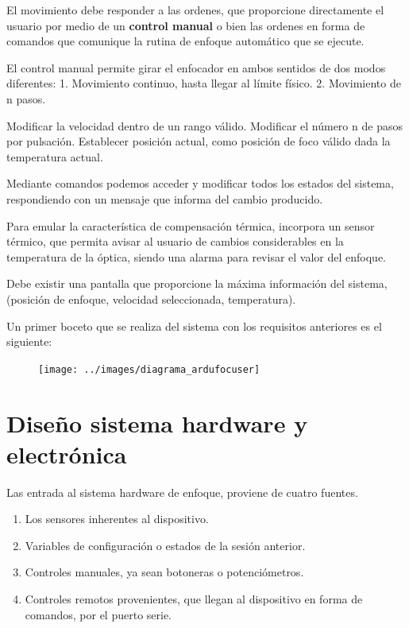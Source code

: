 El movimiento debe responder a las ordenes, que proporcione directamente el usuario por medio de un \textbf{control manual} o bien las ordenes en forma de comandos  que comunique la rutina de enfoque automático que se ejecute.

El control manual permite girar el enfocador en ambos sentidos de dos modos diferentes:
    1. Movimiento continuo, hasta llegar al límite físico.
    2. Movimiento de n pasos.

Modificar la velocidad dentro de un rango válido.
Modificar el número n de pasos por pulsación. 
Establecer posición actual, como posición de foco válido dada la temperatura actual. 
 
Mediante comandos podemos acceder y modificar todos los estados del sistema, respondiendo con un mensaje que informa del cambio producido. 

Para emular la característica de compensación térmica, incorpora un sensor térmico, que permita avisar al usuario de cambios considerables en la temperatura de la óptica, siendo una alarma para revisar el valor del enfoque.  

Debe existir una pantalla que proporcione la máxima información del sistema, (posición de enfoque, velocidad seleccionada, temperatura).


Un primer boceto que se realiza del sistema con los requisitos anteriores es el siguiente:

\begin{figure}[h]
\centering
\texttt{[image: ../images/diagrama\_ardufocuser]}
\caption{}
\label{fig:diagrama_ardufocuser}
\end{figure}


\section{Diseño sistema hardware y electrónica}

Las entrada al sistema hardware de enfoque, proviene de cuatro fuentes.

\begin{enumerate}
\item Los sensores inherentes al dispositivo.
\item Variables de configuración o estados de la sesión anterior. 
\item Controles manuales, ya sean botoneras o potenciómetros.
\item Controles remotos provenientes, que llegan al dispositivo en forma de comandos, por el puerto serie.
\end{enumerate}

